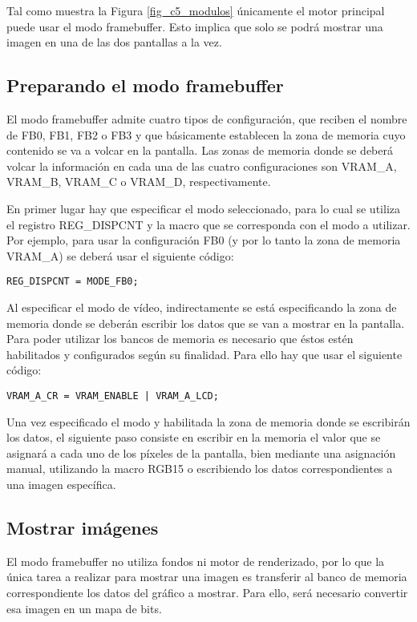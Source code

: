 Tal como muestra la Figura \ref{fig_c5_modulos} únicamente el motor principal puede usar el modo framebuffer. Esto implica que solo se podrá mostrar una imagen en una de las dos pantallas a la vez.
\subsection{Preparando el modo framebuffer}
El modo framebuffer admite cuatro tipos de configuración, que reciben el nombre de FB0, FB1, FB2 o FB3 y que básicamente establecen la zona de memoria cuyo contenido se va a volcar en la pantalla. Las zonas de memoria donde se deberá volcar la información en cada una de las cuatro configuraciones son VRAM\_A, VRAM\_B, VRAM\_C o VRAM\_D, respectivamente.

En primer lugar hay que especificar el modo seleccionado, para lo cual se utiliza el registro REG\_DISPCNT y la macro que se corresponda con el modo a utilizar. Por ejemplo, para usar la configuración FB0 (y por lo tanto la zona de memoria VRAM\_A) se deberá usar el siguiente código:

\begin{verbatim}
REG_DISPCNT = MODE_FB0;
\end{verbatim}

Al especificar el modo de vídeo, indirectamente se está especificando la zona de memoria donde se deberán escribir los datos que se van a mostrar en la pantalla. Para poder utilizar los bancos de memoria es necesario que éstos estén habilitados y configurados según su finalidad. Para ello hay que usar el siguiente código:

\begin{verbatim}
VRAM_A_CR = VRAM_ENABLE | VRAM_A_LCD;
\end{verbatim}

Una vez especificado el modo y habilitada la zona de memoria donde se escribirán los datos, el siguiente paso consiste en escribir en la memoria el valor que se asignará a cada uno de los píxeles de la pantalla, bien mediante una asignación manual, utilizando la macro RGB15 o escribiendo los datos correspondientes a una imagen específica.

\subsection{Mostrar imágenes}
\label{sec:p2_c3_imagenes}
El modo framebuffer no utiliza fondos ni motor de renderizado, por lo que la única tarea a realizar para mostrar una imagen es transferir al banco de memoria correspondiente los datos del gráfico a mostrar. Para ello, será necesario convertir esa imagen en un mapa de bits.

